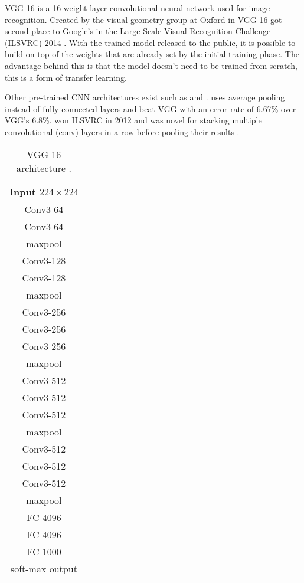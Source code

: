 \newcommand{\isize}[1]{$#1 \times #1$}

VGG-16 is a 16 weight-layer convolutional neural network used for image recognition. Created by the visual geometry group at Oxford in \citeyear{vgg16-arxiv} VGG-16 got second place to Google's \gnet in the Large Scale Visual Recognition Challenge (ILSVRC) 2014 \cite{vgg16-arxiv}. With the trained model released to the public, it is possible to build on top of the weights that are already set by the initial training phase. The advantage behind this is that the model doesn't need to be trained from scratch, this is a form of transfer learning.

Other pre-trained CNN architectures exist such as \gnet and \anet. \gnet uses average pooling instead of fully connected layers \cite{googlenet-paper} and beat VGG with an error rate of 6.67\% over VGG's 6.8\%. \anet won ILSVRC in 2012 and was novel for stacking multiple convolutional (conv) layers in a row before pooling their results \cite{alexnet-paper}. %

\begin{wraptable}{r}{4cm}
    \centering
    \begin{tabular}{| c |}
        \hline
        Input $224 \times 224$ \\
        \hline
        Conv3-64 \\
        Conv3-64 \\
        \hline
        maxpool\\
        \hline
        Conv3-128 \\
        Conv3-128 \\
        \hline
        maxpool \\
        \hline
        Conv3-256 \\
        Conv3-256 \\
        Conv3-256 \\
        \hline
        maxpool \\
        \hline
        Conv3-512 \\
        Conv3-512 \\
        Conv3-512 \\
        \hline
        maxpool \\
        \hline
        Conv3-512 \\
        Conv3-512 \\
        Conv3-512 \\
        \hline
        maxpool\\
        \hline
        FC 4096\\
        \hline
        FC 4096\\
        \hline
        FC 1000\\
        \hline
        soft-max output\\
        \hline
    \end{tabular}
    \caption{VGG-16 architecture \cite{vgg16-arxiv}.}
    \label{vgg-table}
\end{wraptable}

